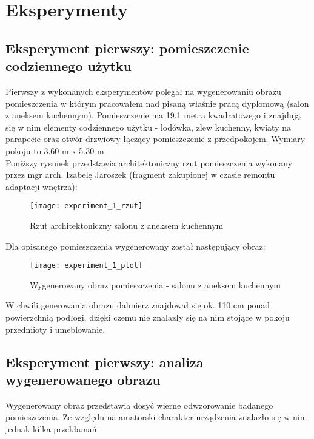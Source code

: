 \section {Eksperymenty}
\subsection {Eksperyment pierwszy: pomieszczenie codziennego użytku}
Pierwszy z wykonanych eksperymentów polegał na wygenerowaniu obrazu pomieszczenia w którym pracowałem nad pisaną właśnie pracą dyplomową (salon z aneksem kuchennym).
Pomieszczenie ma 19.1 metra kwadratowego i znajdują się w nim elementy codziennego użytku - lodówka, zlew kuchenny, kwiaty na parapecie oraz otwór drzwiowy łączący pomieszczenie z przedpokojem. Wymiary pokoju to 3.60 m x 5.30 m.\\

Poniższy rysunek przedstawia architektoniczny rzut pomieszczenia wykonany przez mgr arch. Izabelę Jaroszek (fragment zakupionej w czasie remontu adaptacji wnętrza):
\begin{figure}[h]
    \centering
    \texttt{[image: experiment\_1\_rzut]}
    \caption{Rzut architektoniczny salonu z aneksem kuchennym}
    \label{fig:experiment_1_rzut}
\end{figure}

Dla opisanego pomieszczenia wygenerowany został następujący obraz:
\begin{figure}[h]
    \centering
    \texttt{[image: experiment\_1\_plot]}
    \caption{Wygenerowany obraz pomieszczenia - salonu z aneksem kuchennym}
    \label{fig:experiment_1_plot}
\end{figure}

W chwili generowania obrazu dalmierz znajdował się ok. 110 cm ponad powierzchnią podłogi, dzięki czemu nie znalazły się na nim stojące w pokoju przedmioty i umeblowanie.

\subsection {Eksperyment pierwszy: analiza wygenerowanego obrazu}

Wygenerowany obraz przedstawia dosyć wierne odwzorowanie badanego pomieszczenia. Ze względu na amatorski charakter urządzenia znalazło się w nim jednak kilka przekłamań:

